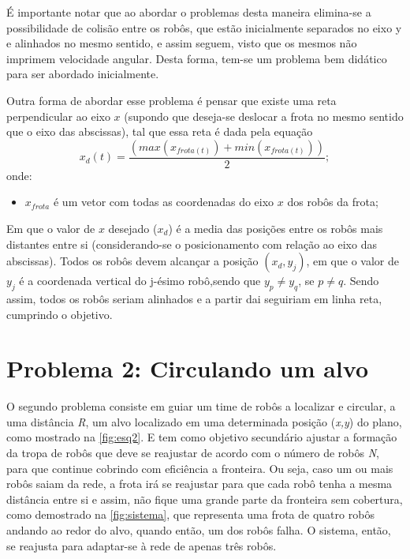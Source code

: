É importante notar que ao abordar o problemas desta maneira elimina-se a possibilidade de colisão entre os robôs, que estão inicialmente separados no eixo y e alinhados no mesmo sentido, e assim seguem, visto que os mesmos não imprimem velocidade angular. Desta forma, tem-se um problema bem didático para ser abordado inicialmente. %

Outra forma de abordar esse problema é pensar que existe uma reta perpendicular ao eixo $x$ (supondo que deseja-se deslocar a frota no mesmo sentido que o eixo das abscissas), tal que essa reta é dada pela equação
\begin{equation}
x_{d} (t) = \dfrac{(max(x_{frota (t)}) + min(x_{frota (t)}))}{2};
\label{eq:xdp1}
\end{equation}
onde:
\begin{itemize}
	\item $x_{frota}$ é um vetor com todas as coordenadas do eixo $x$ dos robôs da frota; 
\end{itemize}
Em que o valor de $x$ desejado ($x_{d}$) é a media das posições entre os robôs mais distantes entre si (considerando-se o posicionamento com relação ao eixo das abscissas). Todos os robôs devem alcançar a posição $(x_{d},y_{j})$, em que o valor de $y_{j}$ é a coordenada vertical do j-ésimo robô,sendo que $y_{p} \neq y_{q}$, se $p \neq q$. Sendo assim, todos os robôs seriam alinhados e a partir dai seguiriam em linha reta, cumprindo o objetivo.

\section{Problema 2: Circulando um alvo}

O segundo problema consiste em guiar um time de robôs a localizar e circular, a uma distância \emph{R}, um alvo localizado em uma determinada posição (\emph{x,y}) do plano, como mostrado na \autoref{fig:esq2}. E tem como objetivo secundário ajustar a formação da tropa de robôs que deve se reajustar de acordo com o número de robôs \emph{N}, para que continue cobrindo com eficiência a fronteira. Ou seja, caso um ou mais robôs saiam da rede, a frota irá se reajustar para que cada robô tenha a mesma distância entre si e assim, não fique uma grande parte da fronteira sem cobertura, como demostrado na \autoref{fig:sistema}, que representa uma frota de quatro robôs andando ao redor do alvo, quando então, um dos robôs falha. O sistema, então, se reajusta para adaptar-se à rede de apenas três robôs.

